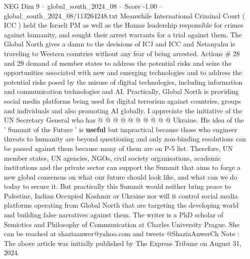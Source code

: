 \begin{textsample}{NEG Dim 9 – global\_south\_2024\_08 – Score -1.00 – global\_south\_2024\_08/113264248.txt}
Meanwhile International Criminal Court ( ICC ) held the Israeli PM as well as the Hamas leadership responsible for crimes against humanity, and sought their arrest warrants for a trial against them.
The Global North gives a damn to the decisions of ICJ and ICC and Netanyahu is traveling to Western countries without any fear of being arrested.
Actions \# 28 and 29 demand of member states to address the potential risks and seize the opportunities associated with new and emerging technologies and to address the potential risks posed by the misuse of digital technologies, including information and communication technologies and AI.
Practically, Global North is providing social media platforms being used for digital terrorism against countries, groups and individuals and also promoting AI globally.
I appreciate the initiative of the UN Secretary General who has @ @ @ @ @ @ @ @ @ @ Ukraine.
His idea of the ' Summit of the Future ' is \textbf{useful} but impractical because those who engineer threats to humanity are beyond questioning and only non-binding resolutions can be passed against them because many of them are on P-5 list.
Therefore, UN member states, UN agencies, NGOs, civil society organisations, academic institutions and the private sector can support the Summit that aims to forge a new global consensus on what our future should look like, and what can we do today to secure it.
But practically this Summit would neither bring peace to Palestine, Indian Occupied Kashmir or Ukraine nor will it control social media platforms operating from Global North that are targeting the developing world and building false narratives against them.
The writer is a PhD scholar of Semiotics and Philosophy of Communication at Charles University Prague.
She can be reached at shaziaanwer@yahoo.com and tweets @ShaziaAnwerCh Note : The above article was initially published by The Express Tribune on August 31, 2024.

\end{textsample}
